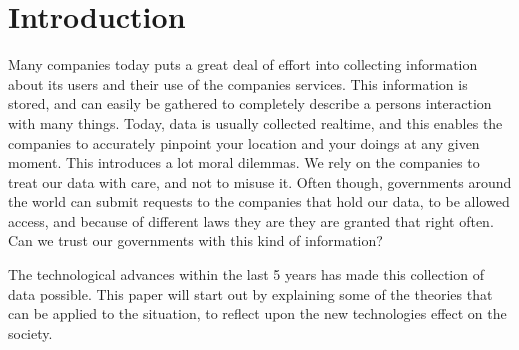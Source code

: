 \section{Introduction}
Many companies today puts a great deal of effort into collecting information about its users and their use of the companies services. This information is stored, and can easily be gathered to completely describe a persons interaction with many things. Today, data is usually collected realtime, and this enables the companies to accurately pinpoint your location and your doings at any given moment. This introduces a lot moral dilemmas. We rely on the companies to treat our data with care, and not to misuse it. Often though, governments around the world can submit requests to the companies that hold our data, to be allowed access, and because of different laws they are they are granted that right often. Can we trust our governments with this kind of information?

The technological advances within the last 5 years has made this collection of data possible.
This paper will start out by explaining some of the theories that can be applied to the situation, to reflect upon the new technologies effect on the society.
\newpage
